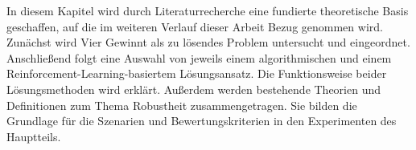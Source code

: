 In diesem Kapitel wird durch Literaturrecherche eine fundierte theoretische Basis geschaffen, auf die im weiteren Verlauf dieser Arbeit Bezug genommen wird. Zunächst wird Vier Gewinnt als zu lösendes Problem untersucht und eingeordnet. Anschließend folgt eine Auswahl von jeweils einem algorithmischen und einem Reinforcement-Learning-basiertem Lösungsansatz. Die Funktionsweise beider Lösungsmethoden wird erklärt. Außerdem werden bestehende Theorien und Definitionen zum Thema Robustheit zusammengetragen. Sie bilden die Grundlage für die Szenarien und Bewertungskriterien in den Experimenten des Hauptteils.